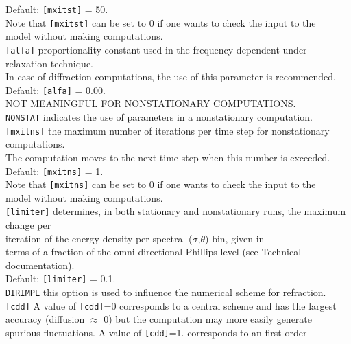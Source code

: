\documentclass[12pt]{book}
\begin{document}
\begin{tabbing}
                  Default: {\tt [mxitst]} = 50.\\
                  Note that {\tt [mxitst]} can be set to 0 if one wants to check the input to the\\
                  model without making computations.\-\\
{\tt [alfa]}   \> proportionality constant used in the frequency-dependent under-relaxation technique.\+\\
                  In case of diffraction computations, the use of this parameter is recommended.\\
                  Default: {\tt [alfa]} = 0.00.\\
                  NOT MEANINGFUL FOR NONSTATIONARY COMPUTATIONS.\-\\
{\tt NONSTAT}  \> indicates the use of parameters in a nonstationary computation.\\
{\tt [mxitns]} \> the maximum number of iterations per time step for nonstationary computations.\+\\
                  The computation moves to the next time step when this number is exceeded.\\
                  Default: {\tt [mxitns]} = 1.\\
                  Note that {\tt [mxitns]} can be set to 0 if one wants to check the input to the\\
                  model without making computations.\-\\
{\tt [limiter]}\> determines, in both stationary and nonstationary runs, the maximum change per\+\\
                  iteration of the energy density per spectral ($\sigma$,$\theta$)-bin, given in\\
                  terms of a fraction of the omni-directional Phillips level (see Technical\\
                  documentation).\\
                  Default: {\tt [limiter]} = 0.1.\-\\
{\tt DIRIMPL}  \> this option is used to influence the numerical scheme for refraction.\\
{\tt [cdd]}    \> A value of {\tt [cdd]}=0 corresponds to a central scheme and has the largest\+\\
                  accuracy (diffusion $\approx$ 0) but the computation may more easily generate\\
                  spurious fluctuations. A value of {\tt [cdd]}=1. corresponds to an first order\\

\end{tabbing}
\end{document}
